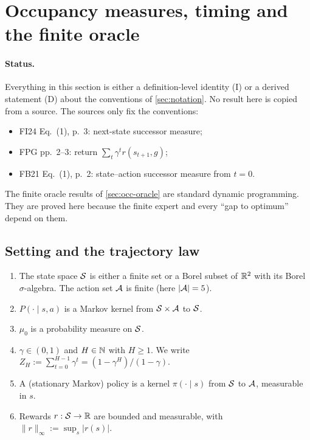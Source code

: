 \section{Occupancy measures, timing and the finite oracle}\label{sec:occ}

\paragraph{Status.}
Everything in this section is either a definition-level identity (\textsf{I}) or a
derived statement (\textsf{D}) about the conventions of \cref{sec:notation}.
No result here is copied from a source.  The sources only fix the conventions:
\begin{itemize}[nosep]
\item FI24 Eq.~(1), p.~3: next-state successor measure;
\item FPG pp.~2--3: return $\sum_t\gamma^t r(s_{t+1},g)$;
\item FB21 Eq.~(1), p.~2: state--action successor measure from $t=0$.
\end{itemize}
The finite oracle results of \cref{sec:occ-oracle} are standard dynamic programming.
They are proved here because the finite expert and every ``gap to optimum'' depend on them.

\subsection{Setting and the trajectory law}\label{sec:occ-setting}

\begin{assumption}[A-MDP]\label{ass:mdp}
\leavevmode
\begin{enumerate}[nosep,label=(\roman*)]
\item The state space $\mathcal{S}$ is either a finite set or a Borel subset of $\mathbb{R}^2$ with its Borel
  $\sigma$-algebra. The action set $\mathcal{A}$ is finite (here $|\mathcal{A}|=5$).
\item $P(\cdot\mid s,a)$ is a Markov kernel from $\mathcal{S}\times\mathcal{A}$ to $\mathcal{S}$.
\item $\mu_0$ is a probability measure on $\mathcal{S}$.
\item $\gamma\in(0,1)$ and $H\in\mathbb{N}$ with $H\ge1$. We write $Z_H:=\sum_{t=0}^{H-1}\gamma^t=(1-\gamma^H)/(1-\gamma)$.
\item A (stationary Markov) policy is a kernel $\pi(\cdot\mid s)$ from $\mathcal{S}$ to $\mathcal{A}$, measurable in $s$.
\item Rewards $r:\mathcal{S}\to\mathbb{R}$ are bounded and measurable, with $\|r\|_\infty:=\sup_s|r(s)|$.
\end{enumerate}
\end{assumption}


